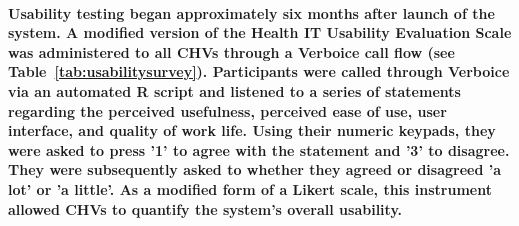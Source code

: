 \paragraph{Usability testing began approximately six months after launch of the system. A modified version of the Health IT Usability Evaluation Scale \citep{Yen2010} was administered to all CHVs through a Verboice call flow (see Table~\ref{tab:usabilitysurvey}). Participants were called through Verboice via an automated R script and listened to a series of statements regarding the perceived usefulness, perceived ease of use, user interface, and quality of work life. Using their numeric keypads, they were asked to press '1' to agree with the statement and '3' to disagree. They were subsequently asked to whether they agreed or disagreed 'a lot' or 'a little'. As a modified form of a Likert scale, this instrument allowed CHVs to quantify the system's overall usability.}



